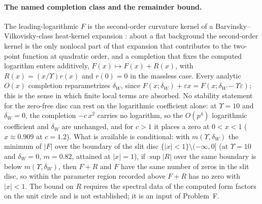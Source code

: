 \paragraph{The named completion class and the remainder bound.}
The leading-logarithmic \(F\) is the second-order curvature kernel
of a Barvinsky--Vilkovisky-class heat-kernel expansion
\cite{BarvinskyVilkovisky1990}: about a flat background the
second-order kernel is the only nonlocal part of that expansion
that contributes to the two-point function at quadratic order, and
a completion that fixes the computed logarithm enters additively,
\(F(x)\mapsto F(x)+R(x)\), with \(R(x)=(x/\Upsilon)r(x)\) and
\(r(0)=0\) in the massless case. Every analytic \(O(x)\) completion
reparametrizes \(\delta_W\), since
\(F(x;\delta_W)+\varepsilon x=F(x;\delta_W-\Upsilon\varepsilon)\);
this is the sense in which finite local terms are absorbed. No
stability statement for the zero-free disc can rest on the
logarithmic coefficient alone: at \(\Upsilon=10\) and
\(\delta_W=0\), the completion \(-c\,x^{2}\) carries no logarithm,
so the \(O(p^4)\) logarithmic coefficient and \(\delta_W\) are
unchanged, and for \(c>1\) it places a zero at \(0<x<1\)
(\(x\approx0.909\) at \(c=1.2\)). What is available is
conditional: with \(m(\Upsilon,\delta_W)\) the minimum of \(|F|\)
over the boundary of the slit disc
\(\{|x|<1\}\setminus(-\infty,0]\) (at \(\Upsilon=10\) and
\(\delta_W=0\), \(m=0.82\), attained at \(|x|=1\)), if
\(\sup|R|\) over the same boundary is below
\(m(\Upsilon,\delta_W)\), then \(F+R\) and \(F\) have the same
number of zeros in the slit disc, so within the parameter region
recorded above \(F+R\) has no zero with \(|x|<1\). The bound on
\(R\) requires the spectral data of the computed form factors on
the unit circle and is not established; it is an input of
Problem~F.
